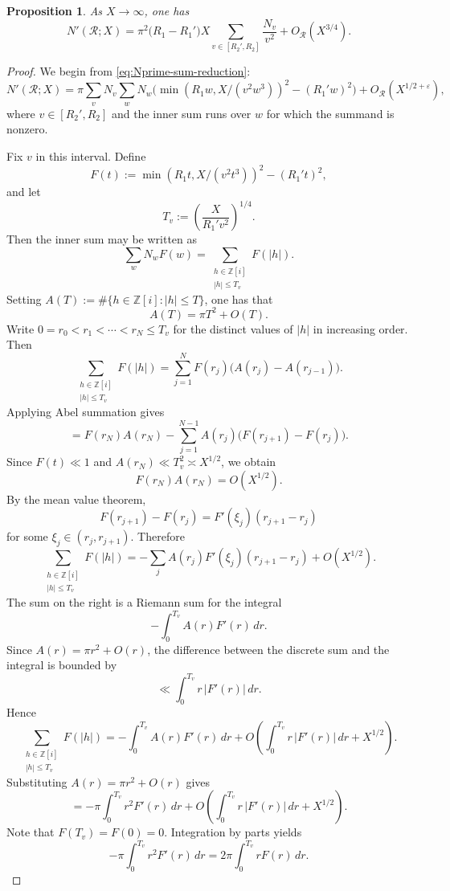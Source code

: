 \documentclass{amsart}
\newcommand{\Z}{\mathbb{Z}}
\theoremstyle{plain}
\newtheorem{proposition}[theorem]{Proposition}
\theoremstyle{definition}
\theoremstyle{remark}
\numberwithin{equation}{section}
\begin{document}
\begin{proposition}\label{Propn N' count}
As $X\to\infty$, one has
\[
N'(\mathcal R;X)
=
\pi^2\bigl(R_1-R_1'\bigr)
X
\sum_{v\in[R_2',R_2]}
\frac{N_v}{v^2}
+
O_{\mathcal R}(X^{3/4}).
\]
\end{proposition}

\begin{proof}
We begin from \eqref{eq:Nprime-sum-reduction}:
\[
N'(\mathcal R;X)
=
\pi
\sum_{v} N_v
\sum_{w}
N_w
\Big(
\min(R_1w,X/(v^2w^3))^2
-
(R_1'w)^2
\Big)
+
O_{\mathcal R}(X^{1/2+\varepsilon}),
\]
where $v\in[R_2',R_2]$ and the inner sum runs over $w$ for which the
summand is nonzero.

Fix $v$ in this interval.  Define
\[
F(t)
:=
\min(R_1t,X/(v^2t^3))^2
-
(R_1't)^2,
\]
and let
\[
T_v := \left(\frac{X}{R_1'v^2}\right)^{1/4}.
\]
Then the inner sum may be written as
\[
\sum_{w} N_w F(w)
=
\sum_{\substack{h\in\Z[i]\\ |h|\le T_v}} F(|h|).
\]
Setting $A(T):=\#\{h\in\Z[i]: |h|\le T\}$, one has that
\[
A(T)=\pi T^2+O(T).
\]
\noindent Write $0=r_0<r_1<\cdots<r_N\le T_v$ for the distinct values of $|h|$ in
increasing order.  Then
\[
\sum_{\substack{h\in\Z[i]\\ |h|\le T_v}} F(|h|)
=
\sum_{j=1}^N F(r_j)\bigl(A(r_j)-A(r_{j-1})\bigr).
\]
\noindent Applying Abel summation gives
\[
=
F(r_N)A(r_N)
-
\sum_{j=1}^{N-1} A(r_j)\bigl(F(r_{j+1})-F(r_j)\bigr).
\]
Since $F(t)\ll 1$ and $A(r_N)\ll T_v^2\asymp X^{1/2}$, we obtain
\[
F(r_N)A(r_N)=O(X^{1/2}).
\]
By the mean value theorem,
\[
F(r_{j+1})-F(r_j)
=
F'(\xi_j)(r_{j+1}-r_j)
\]
for some $\xi_j\in(r_j,r_{j+1})$.  Therefore
\[
\sum_{\substack{h\in\Z[i]\\ |h|\le T_v}} F(|h|)
=
-\sum_{j} A(r_j)F'(\xi_j)(r_{j+1}-r_j)
+
O(X^{1/2}).
\]
\noindent The sum on the right is a Riemann sum for the integral
\[
-\int_0^{T_v} A(r)F'(r)\,dr.
\]
Since $A(r)=\pi r^2+O(r)$, the difference between the discrete sum and the
integral is bounded by
\[
\ll \int_0^{T_v} r\,|F'(r)|\,dr.
\]
Hence
\[
\sum_{\substack{h\in\Z[i]\\ |h|\le T_v}} F(|h|)
=
-\int_0^{T_v} A(r)F'(r)\,dr
+
O\!\left(
\int_0^{T_v} r\,|F'(r)|\,dr
+
X^{1/2}
\right).
\]
\noindent Substituting $A(r)=\pi r^2+O(r)$ gives
\[
=
-\pi\int_0^{T_v} r^2F'(r)\,dr
+
O\!\left(
\int_0^{T_v} r\,|F'(r)|\,dr
+
X^{1/2}
\right).
\]
Note that $F(T_v)=F(0)=0$. Integration by parts yields
\[
-\pi\int_0^{T_v} r^2F'(r)\,dr
=
2\pi\int_0^{T_v} rF(r)\,dr.
\]


\end{proof}
\end{document}
